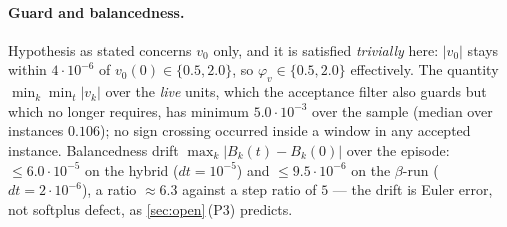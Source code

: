\paragraph{Guard and balancedness.}
Hypothesis  as stated concerns $v_0$ only, and it is satisfied
\emph{trivially} here: $|v_0|$ stays within $4\cdot10^{-6}$ of $v_0(0)\in
\{0.5,2.0\}$, so $\varphi_v\in\{0.5,2.0\}$ effectively. The quantity
$\min_k\min_t|v_k|$ over the \emph{live} units, which the acceptance filter also
guards but which  no longer requires, has minimum
$5.0\cdot10^{-3}$ over the sample (median over instances $0.106$); no sign
crossing occurred inside a window in any accepted instance. Balancedness drift
$\max_k|B_k(t)-B_k(0)|$ over the episode: $\le6.0\cdot10^{-5}$ on the hybrid
($dt=10^{-5}$) and $\le9.5\cdot10^{-6}$ on the $\beta$-run
($dt=2\cdot10^{-6}$), a ratio $\approx6.3$ against a step ratio of $5$ --- the
drift is Euler error, not softplus defect, as \cref{sec:open}\,(P3) predicts.
